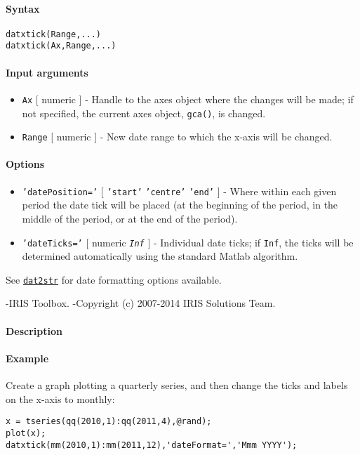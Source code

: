 


	\paragraph{Syntax}\label{syntax}

\begin{verbatim}
datxtick(Range,...)
datxtick(Ax,Range,...)
\end{verbatim}

\paragraph{Input arguments}\label{input-arguments}

\begin{itemize}
\item
  \texttt{Ax} {[} numeric {]} - Handle to the axes object where the
  changes will be made; if not specified, the current axes object,
  \texttt{gca()}, is changed.
\item
  \texttt{Range} {[} numeric {]} - New date range to which the x-axis
  will be changed.
\end{itemize}

\paragraph{Options}\label{options}

\begin{itemize}
\item
  \texttt{'datePosition='} {[} \texttt{'start'} \textbar{}
  \texttt{'centre'} \textbar{} \texttt{'end'} {]} - Where within each
  given period the date tick will be placed (at the beginning of the
  period, in the middle of the period, or at the end of the period).
\item
  \texttt{'dateTicks='} {[} numeric \textbar{} \emph{\texttt{Inf}} {]} -
  Individual date ticks; if \texttt{Inf}, the ticks will be determined
  automatically using the standard Matlab algorithm.
\end{itemize}

See \href{dates/dat2str}{\texttt{dat2str}} for date formatting options
available.

-IRIS Toolbox. -Copyright (c) 2007-2014 IRIS Solutions Team.

\paragraph{Description}\label{description}

\paragraph{Example}\label{example}

Create a graph plotting a quarterly series, and then change the ticks
and labels on the x-axis to monthly:

\begin{verbatim}
x = tseries(qq(2010,1):qq(2011,4),@rand);
plot(x);
datxtick(mm(2010,1):mm(2011,12),'dateFormat=','Mmm YYYY');
\end{verbatim}


